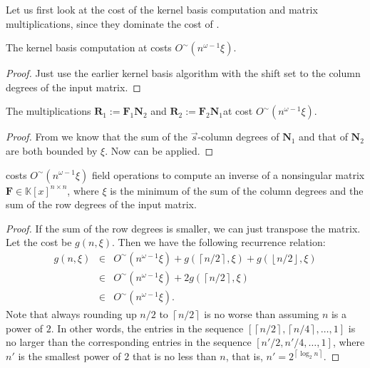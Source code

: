 Let us first look at the cost of the kernel basis computation and
matrix multiplications, since they dominate the cost of . 
\begin{lem}
The kernel basis computation at 
costs $O^{\sim}(n^{\omega-1}\xi)$.\end{lem}
\begin{proof}
Just use the earlier kernel basis algorithm with the shift set to
the column degrees of the input matrix.\end{proof}
\begin{lem}
The multiplications $\mathbf{R}_{1}:=\mathbf{F}_{1}\mathbf{N}_{2}$
and $\mathbf{R}_{2}:=\mathbf{F}_{2}\mathbf{N}_{1}$at 
cost $O^{\sim}(n^{\omega-1}\xi)$.\end{lem}
\begin{proof}
From  we know
that the sum of the $\vec{s}$-column degrees of $\mathbf{N}_{1}$
and that of $\mathbf{N}_{2}$ are both bounded by $\xi$. Now 
can be applied.\end{proof}
\begin{thm}
\label{thm:inverseCost} costs $O^{\sim}\left(n^{\omega-1}\xi\right)$
field operations to compute an inverse of a nonsingular matrix $\mathbf{F}\in\mathbb{K}\left[x\right]^{n\times n}$,
where $\xi$ is the minimum of the sum of the column degrees and the
sum of the row degrees of the input matrix.\end{thm}
\begin{proof}
If the sum of the row degrees is smaller, we can just transpose the
matrix. Let the cost be $g(n,\xi)$. Then we have the following recurrence
relation:
\begin{eqnarray*}
g(n,\xi) & \in & O^{\sim}(n^{\omega-1}\xi)+g(\left\lceil n/2\right\rceil ,\xi)+g(\left\lfloor n/2\right\rfloor ,\xi)\\
 & \in & O^{\sim}(n^{\omega-1}\xi)+2g(\left\lceil n/2\right\rceil ,\xi)\\
 & \in & O^{\sim}(n^{\omega-1}\xi).
\end{eqnarray*}
 Note that always rounding up $n/2$ to $\left\lceil n/2\right\rceil $
is no worse than assuming $n$ is a power of $2$. In other words,
the entries in the sequence $\left[\left\lceil n/2\right\rceil ,\left\lceil n/4\right\rceil ,\dots,1\right]$
is no larger than the corresponding entries in the sequence $\left[n'/2,n'/4,\dots,1\right]$,
where $n'$ is the smallest power of $2$ that is no less than $n$,
that is, $n'=2^{\left\lceil \log_{2}n\right\rceil }$. \end{proof}
